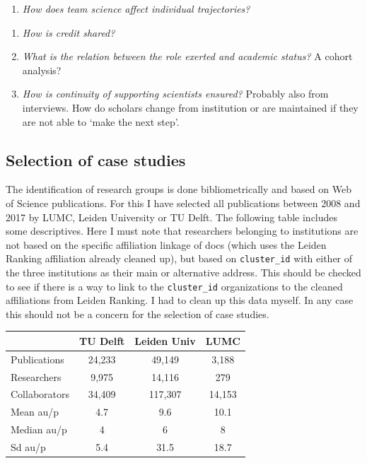 \documentclass[]{article}
\providecommand{\tightlist}{%
  \setlength{\itemsep}{0pt}\setlength{\parskip}{0pt}}
\begin{document}
\begin{enumerate}
\def\labelenumi{\arabic{enumi}.}
\setcounter{enumi}{2}
\tightlist
\item
  \emph{How does team science affect individual trajectories?}
\end{enumerate}

\begin{enumerate}
\def\labelenumi{\roman{enumi}.}
\tightlist
\item
  \emph{How is credit shared?}
\item
  \emph{What is the relation between the role exerted and academic
  status?} A cohort analysis?
\item
  \emph{How is continuity of supporting scientists ensured?} Probably
  also from interviews. How do scholars change from institution or are
  maintained if they are not able to `make the next step'.
\end{enumerate}

\subsection{Selection of case studies}\label{selection-of-case-studies}

The identification of research groups is done bibliometrically and based
on Web of Science publications. For this I have selected all
publications between 2008 and 2017 by LUMC, Leiden University or TU
Delft. The following table includes some descriptives. Here I must note
that researchers belonging to institutions are not based on the specific
affiliation linkage of docs (which uses the Leiden Ranking affiliation
already cleaned up), but based on \texttt{cluster\_id} with either of
the three institutions as their main or alternative address. This should
be checked to see if there is a way to link to the \texttt{cluster\_id}
organizations to the cleaned affiliations from Leiden Ranking. I had to
clean up this data myself. In any case this should not be a concern for
the selection of case studies.

\begin{longtable}[]{@{}lccc@{}}
\toprule
& TU Delft & Leiden Univ & LUMC\tabularnewline
\midrule
\endhead
Publications & 24,233 & 49,149 & 3,188\tabularnewline
Researchers & 9,975 & 14,116 & 279\tabularnewline
Collaborators & 34,409 & 117,307 & 14,153\tabularnewline
Mean au/p & 4.7 & 9.6 & 10.1\tabularnewline
Median au/p & 4 & 6 & 8\tabularnewline
Sd au/p & 5.4 & 31.5 & 18.7\tabularnewline
\bottomrule
\end{longtable}
\end{document}
